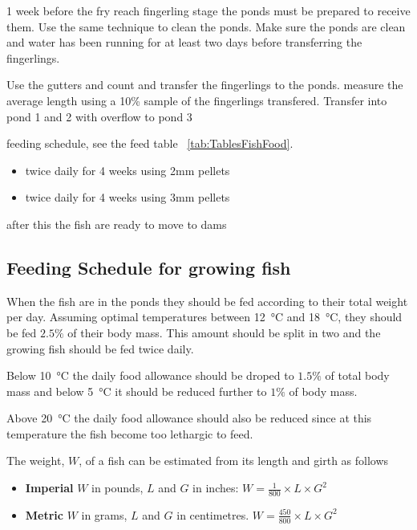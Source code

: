 1 week before the fry reach fingerling stage the ponds must be prepared to receive them.
Use the same technique to clean the ponds. Make sure the ponds are clean and water has
been running for at least two days before transferring the fingerlings.
\marginpar{15 \W}

    Use the gutters and count and transfer the fingerlings to the ponds.
    measure the average length using a 10\% sample of the fingerlings transfered.
    Transfer into pond 1 and 2 with overflow to pond 3   
    \marginpar{16 \W}
    
    
    feeding schedule, see the feed table ~\ref{tab:TablesFishFood}.
        \begin{itemize}
          \item twice daily for 4 weeks using 2mm pellets
          \item twice daily for 4 weeks using 3mm pellets
          \end{itemize}
     after this the fish are ready to move to dams 
     \marginpar{24 \W}

\subsection{Feeding Schedule for growing fish}

When the fish are in the ponds they should be fed according to their total weight per day.
Assuming optimal temperatures between \SI{12}{\celsius} and \SI{18}{\celsius}, they should be fed
$2.5\%$ of their body mass. This amount should be split in two and the growing fish should be fed twice daily.

Below \SI{10}{\celsius} the daily food allowance should be droped to $1.5\%$ of total body mass and below
\SI{5}{\celsius} it should be reduced further to $1\%$ of body mass.

Above \SI{20}{\celsius} the daily food allowance should also be reduced since at this temperature the fish become too lethargic to feed.

The weight, $W$, of a fish can be estimated from its length and girth as follows

\begin{itemize}

\item[] {\bf Imperial} $W$ in pounds, $L$ and $G$ in inches:
$ W  = \frac{1}{800} \times L  \times G^2 $

\item[] {\bf Metric} $W$ in grams, $L$ and $G$ in centimetres.
$ W  =   \frac{450}{800} \times L  \times G^2 $

\end{itemize}

